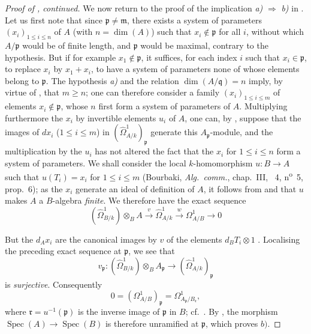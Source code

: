 \begin{proof}[Proof of {}, continued]
We now return to the proof of the implication \emph{a)} $\Rightarrow$ \emph{b)} in .
Let us first note that since $\mathfrak{p}\neq\mathfrak{m}$, there exists a system of parameters $(x_i)_{1\leq i\leq n}$ of $A$ (with $n=\dim(A)$) such that $x_i\notin\mathfrak{p}$ for all $i$, without which $A/\mathfrak{p}$ would be of finite length, and $\mathfrak{p}$ would be maximal, contrary to the hypothesis.
But if for example $x_1\notin\mathfrak{p}$, it suffices, for each index $i$ such that $x_i\in\mathfrak{p}$, to replace $x_i$ by $x_1+x_i$, to have a system of parameters none of whose elements belong to $\mathfrak{p}$.
The hypothesis \emph{a)} and the relation $\dim(A/\mathfrak{q})=n$ imply, by virtue of , that $m\geq n$; one can therefore consider a family $(x_i)_{1\leq i\leq m}$ of elements $x_i\notin\mathfrak{p}$, whose $n$ first form a system of parameters of $A$.
Multiplying furthermore the $x_i$ by invertible elements $u_i$ of $A$, one can, by , suppose that the images of $dx_i$ ($1\leq i\leq m$) in $(\hat{\Omega}^1_{A/k})_\mathfrak{p}$ generate this $A_\mathfrak{p}$-module, and the multiplication by the $u_i$ has not altered the fact that the $x_i$ for $1\leq i\leq n$ form a system of parameters.
We shall consider the local $k$-homomorphism $u:B\to A$ such that $u(T_i)=x_i$ for $1\leq i\leq m$ (Bourbaki, \emph{Alg.\ comm.}, chap.~III, \textsection~4, n\textsuperscript{o}~5, prop.~6); as the $x_i$ generate an ideal of definition of $A$, it follows from  and  that $u$ makes $A$ a $B$-algebra \emph{finite}.
We therefore have the exact sequence 
\[
  (\hat{\Omega}^1_{B/k})\otimes_BA\xrightarrow{v}\hat{\Omega}^1_{A/k}\xrightarrow{w}\Omega^1_{A/B}\longrightarrow 0
\]

But the $d_Ax_i$ are the canonical images by $v$ of the elements $d_BT_i\otimes 1$ .
Localising the preceding exact sequence at $\mathfrak p$, we see that
\[
  v_\mathfrak p:(\hat{\Omega}^1_{B/k})\otimes_BA_\mathfrak p
  \longrightarrow(\hat{\Omega}^1_{A/k})_\mathfrak p
\]
is \emph{surjective}. Consequently
\[
  0=(\Omega^1_{A/B})_\mathfrak p
   =\Omega^1_{A_\mathfrak p/B_\mathfrak r},
\]
where $\mathfrak r=u^{-1}(\mathfrak p)$ is the inverse image of $\mathfrak p$ in $B$; cf.\ . By , the morphism $\operatorname{Spec}(A)\to\operatorname{Spec}(B)$ is therefore unramified at $\mathfrak p$, which proves $b)$.
\end{proof}


